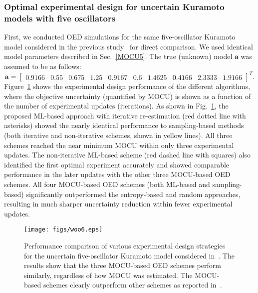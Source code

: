 \documentclass{article}
\begin{document}
\subsubsection{Optimal experimental design for uncertain Kuramoto models with five oscillators}
First, we conducted OED simulations for the same five-oscillator Kuramoto model considered in the previous study~\cite{Hong2021} for direct comparison. We used identical model parameters described in Sec.~\ref{MOCU5}. The true (unknown) model ${\mathbf{a}}$ was assumed to be as follows:
\begin{equation}
\mathbf{a} =
\left[\begin{matrix}
  0.9166 & 0.55 & 0.675 & 1.25 & 0.9167 & 0.6 & 1.4625 & 0.4166 & 2.3333 & 1.9166 
\end{matrix}\right]^T.
\end{equation}
Figure~\ref{fig6} shows the experimental design performance of the different algorithms, where the objective uncertainty (quantified by MOCU) is shown as a function of the number of experimental updates (iterations). As shown in Fig.~\ref{fig6}, the proposed ML-based approach with iterative re-estimation (red dotted line with asterisks) showed the nearly identical performance to sampling-based methods (both iterative and non-iterative schemes, shown in yellow lines). All three schemes reached the near minimum MOCU within only three experimental updates. The non-iterative ML-based scheme (red dashed line with squares) also identified the first optimal experiment accurately and showed comparable performance in the later updates with the other three MOCU-based OED schemes. All four MOCU-based OED schemes (both ML-based and sampling-based) significantly outperformed the entropy-based and random approaches, resulting in much sharper uncertainty reduction within fewer experimental updates.
\begin{figure}
\centering
\texttt{[image: figs/woo6.eps]}
\caption{Performance comparison of various experimental design strategies for the uncertain five-oscillator Kuramoto model considered in~\cite{Hong2021}. The results show that the three MOCU-based OED schemes perform similarly, regardless of how MOCU was estimated. The MOCU-based schemes clearly outperform other schemes as reported in~\cite{Hong2021}.}
\label{fig6}
\end{figure}
\end{document}

